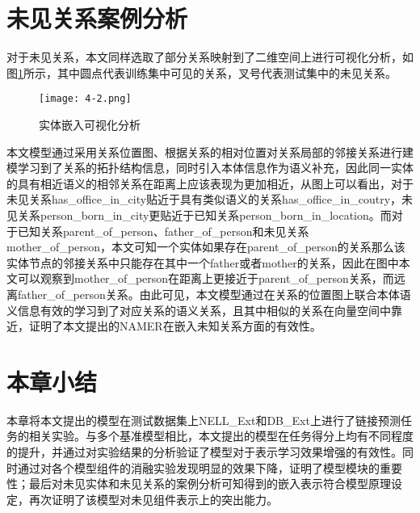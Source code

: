 \section{未见关系案例分析}
对于未见关系，本文同样选取了部分关系映射到了二维空间上进行可视化分析，如图\ref{fig:4-2}所示，其中圆点代表训练集中可见的关系，叉号代表测试集中的未见关系。
\begin{figure}[h]
  \centering
  \texttt{[image: 4-2.png]}
  \caption{实体嵌入可视化分析}
  \label{fig:4-2}
\end{figure}

本文模型通过采用关系位置图、根据关系的相对位置对关系局部的邻接关系进行建模学习到了关系的拓扑结构信息，同时引入本体信息作为语义补充，因此同一实体的具有相近语义的相邻关系在距离上应该表现为更加相近，从图上可以看出，对于未见关系has\_office\_in\_city贴近于具有类似语义的关系has\_office\_in\_coutry，未见关系person\_born\_in\_city更贴近于已知关系person\_born\_in\_location。而对于已知关系parent\_of\_person、father\_of\_person和未见关系mother\_of\_person，本文可知一个实体如果存在parent\_of\_person的关系那么该实体节点的邻接关系中只能存在其中一个father或者mother的关系，因此在图中本文可以观察到mother\_of\_person在距离上更接近于parent\_of\_person关系，而远离father\_of\_person关系。由此可见，本文模型通过在关系的位置图上联合本体语义信息有效的学习到了对应关系的语义关系，且其中相似的关系在向量空间中靠近，证明了本文提出的NAMER在嵌入未知关系方面的有效性。

\section{本章小结}
本章将本文提出的模型在测试数据集上NELL\_Ext和DB\_Ext上进行了链接预测任务的相关实验。与多个基准模型相比，本文提出的模型在任务得分上均有不同程度的提升，并通过对实验结果的分析验证了模型对于表示学习效果增强的有效性。同时通过对各个模型组件的消融实验发现明显的效果下降，证明了模型模块的重要性；最后对未见实体和未见关系的案例分析可知得到的嵌入表示符合模型原理设定，再次证明了该模型对未见组件表示上的突出能力。